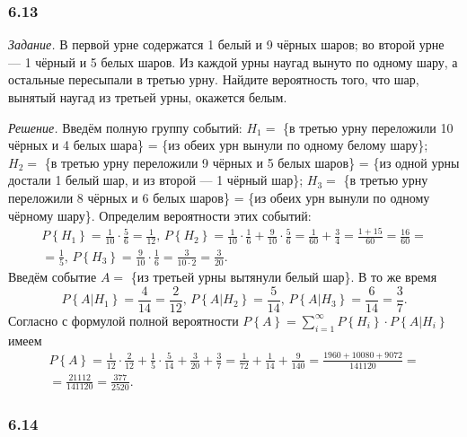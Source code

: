 \subsubsection*{6.13}

\textit{Задание.} В первой урне содержатся 1 белый и 9 чёрных шаров; во второй урне --- 1 чёрный и 5 белых шаров.
Из каждой урны наугад вынуто по одному шару, а остальные пересыпали в третью урну.
Найдите вероятность того, что шар, вынятый наугад из третьей урны, окажется белым.

\textit{Решение.}
Введём полную группу событий:
$H_1 =$ \{в третью урну переложили 10 чёрных и 4 белых шара\} = \{из обеих урн вынули по одному белому шару\};
$H_2 =$ \{в третью урну переложили 9 чёрных и 5 белых шаров\} = \{из одной урны достали 1 белый шар, и из второй --- 1 чёрный шар\};
$H_3 =$ \{в третью урну переложили 8 чёрных и 6 белых шаров\} = \{из обеих урн вынули по одному чёрному шару\}.
Определим вероятности этих событий:
\begin{equation*}
\begin{split}
P \left\{ H_1 \right\} =
\frac{1}{10} \cdot \frac{5}{6} =
\frac{1}{12}, \,
P \left\{ H_2 \right\} =
\frac{1}{10} \cdot \frac{1}{6} + \frac{9}{10} \cdot \frac{5}{6} =
\frac{1}{60} + \frac{3}{4} =
\frac{1+15}{60} =
\frac{16}{60} = \\
= \frac{1}{5}, \,
P \left\{ H_3 \right\} =
\frac{9}{10} \cdot \frac{1}{6} =
\frac{3}{10 \cdot 2} =
\frac{3}{20}.
\end{split}
\end{equation*}
Введём событие $A =$ \{из третьей урны вытянули белый шар\}.
В то же время
$$P \left\{ \left. A \right| H_1 \right\} =
\frac{4}{14} =
\frac{2}{12}, \,
P \left\{ \left. A \right| H_2 \right\} =
\frac{5}{14}, \,
P \left\{ \left. A \right| H_3 \right\} =
\frac{6}{14} =
\frac{3}{7}.$$
Согласно с формулой полной вероятности $P \left\{ A \right\} = \sum \limits_{i=1}^\infty P \left\{ H_i \right\} \cdot P \left\{ \left. A \right| H_i \right\} $ имеем
\begin{equation*}
\begin{split}
P \left\{ A \right\} =
\frac{1}{12} \cdot \frac{2}{12} + \frac{1}{5} \cdot \frac{5}{14} + \frac{3}{20} + \frac{3}{7} =
\frac{1}{72} + \frac{1}{14} + \frac{9}{140} =
\frac{1960+10080+9072}{141120} = \\
= \frac{21112}{141120}=
\frac{377}{2520}.
\end{split}
\end{equation*}

\subsubsection*{6.14}

